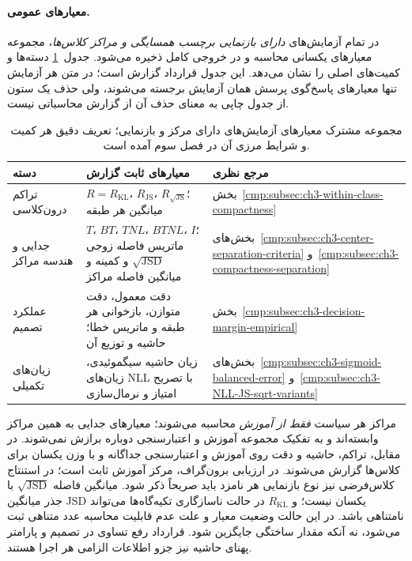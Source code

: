 \paragraph{معیارهای عمومی.}
در تمام آزمایش‌های \emph{دارای بازنمایی برچسب
همسایگی و مراکز کلاس‌ها}، مجموعه معیارهای
یکسانی محاسبه و در خروجی کامل ذخیره می‌شود.
جدول~\ref{tab:ch4-common-metric-registry}
دسته‌ها و کمیت‌های اصلی را نشان می‌دهد.
این جدول قرارداد گزارش است؛
در متن هر آزمایش تنها معیارهای پاسخ‌گوی
پرسش همان آزمایش برجسته می‌شوند،
ولی حذف یک ستون از جدول چاپی به معنای
حذف آن از گزارش محاسباتی نیست.
\begin{table}[htbp]
\centering\small
\caption{مجموعه مشترک معیارهای آزمایش‌های دارای مرکز و بازنمایی؛ تعریف دقیق هر کمیت و شرایط مرزی آن در فصل سوم آمده است.}
\label{tab:ch4-common-metric-registry}
\begin{tabular}{p{.17\linewidth}p{.38\linewidth}p{.35\linewidth}}\hline
دسته & معیارهای ثابت گزارش & مرجع نظری\\\hline
تراکم درون‌کلاسی &
$R=R_{\mathrm{KL}}$،
$R_{\mathrm{JS}}$،
$R_{\sqrt{\mathrm{JS}}}$؛
میانگین هر طبقه &
بخش~\ref{cmp:subsec:ch3-within-class-compactness}\\
جدایی و هندسه مراکز &
$T$، $BT$، $TNL$، $BTNL$، $I$؛
ماتریس فاصله زوجی
$\sqrt{\mathrm{JSD}}$ و
کمینه و میانگین فاصله مراکز &
بخش‌های~\ref{cmp:subsec:ch3-center-separation-criteria}
و~\ref{cmp:subsec:ch3-compactness-separation}\\
عملکرد تصمیم &
دقت معمول، دقت متوازن،
بازخوانی هر طبقه و ماتریس خطا؛
حاشیه و توزیع آن &
بخش~\ref{cmp:subsec:ch3-decision-margin-empirical}\\
زیان‌های تکمیلی &
زیان حاشیه سیگموئیدی، زیان‌های
NLL با تصریح امتیاز و نرمال‌سازی &
بخش‌های~\ref{cmp:subsec:ch3-sigmoid-balanced-error}
و~\ref{cmp:subsec:ch3-NLL-JS-sqrt-variants}\\\hline
\end{tabular}
\end{table}

مراکز هر سیاست \emph{فقط از آموزش} محاسبه
می‌شوند؛ معیارهای جدایی به همین مراکز
وابسته‌اند و به تفکیک مجموعه آموزش و
اعتبارسنجی دوباره برازش نمی‌شوند.
در مقابل، تراکم، حاشیه و دقت روی
آموزش و اعتبارسنجی جداگانه و با
وزن یکسان برای کلاس‌ها گزارش می‌شوند.
در ارزیابی برون‌گراف، مرکز آموزش ثابت است؛
در استنتاج کلاس‌فرضی نیز نوع بازنمایی
هر نامزد باید صریحاً ذکر شود.
میانگین فاصله $\sqrt{\mathrm{JSD}}$
با جذر میانگین JSD یکسان نیست؛
و $R_{\mathrm{KL}}$ در حالت ناسازگاری
تکیه‌گاه‌ها می‌تواند نامتناهی باشد.
در این حالت وضعیت معیار و علت عدم
قابلیت محاسبه عدد متناهی ثبت می‌شود،
نه آنکه مقدار ساختگی جایگزین شود.
قرارداد رفع تساوی در تصمیم و
پارامتر پهنای حاشیه نیز جزو اطلاعات
الزامی هر اجرا هستند.

